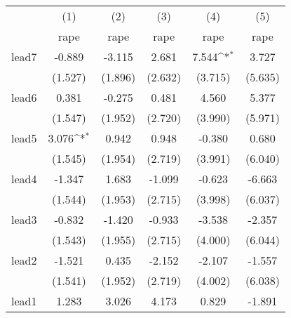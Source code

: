 {
\def\sym#1{\ifmmode^{#1}\else\(^{#1}\)\fi}
\begin{tabular}{l*{5}{c}}
\hline\hline
            &\multicolumn{1}{c}{(1)}&\multicolumn{1}{c}{(2)}&\multicolumn{1}{c}{(3)}&\multicolumn{1}{c}{(4)}&\multicolumn{1}{c}{(5)}\\
            &\multicolumn{1}{c}{rape}&\multicolumn{1}{c}{rape}&\multicolumn{1}{c}{rape}&\multicolumn{1}{c}{rape}&\multicolumn{1}{c}{rape}\\
\hline
lead7       &      -0.889         &      -3.115         &       2.681         &       7.544\sym{*}  &       3.727         \\
            &     (1.527)         &     (1.896)         &     (2.632)         &     (3.715)         &     (5.635)         \\
[1em]
lead6       &       0.381         &      -0.275         &       0.481         &       4.560         &       5.377         \\
            &     (1.547)         &     (1.952)         &     (2.720)         &     (3.990)         &     (5.971)         \\
[1em]
lead5       &       3.076\sym{*}  &       0.942         &       0.948         &      -0.380         &       0.680         \\
            &     (1.545)         &     (1.954)         &     (2.719)         &     (3.991)         &     (6.040)         \\
[1em]
lead4       &      -1.347         &       1.683         &      -1.099         &      -0.623         &      -6.663         \\
            &     (1.544)         &     (1.953)         &     (2.715)         &     (3.998)         &     (6.037)         \\
[1em]
lead3       &      -0.832         &      -1.420         &      -0.933         &      -3.538         &      -2.357         \\
            &     (1.543)         &     (1.955)         &     (2.715)         &     (4.000)         &     (6.044)         \\
[1em]
lead2       &      -1.521         &       0.435         &      -2.152         &      -2.107         &      -1.557         \\
            &     (1.541)         &     (1.952)         &     (2.719)         &     (4.002)         &     (6.038)         \\
[1em]
lead1       &       1.283         &       3.026         &       4.173         &       0.829         &      -1.891         \\

\end{tabular}}
